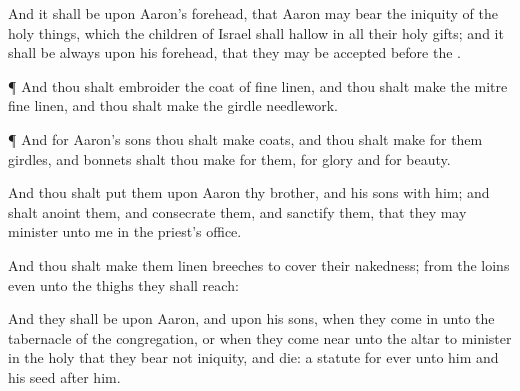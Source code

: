 {And it shall be upon
Aaron’s
forehead, that
Aaron may
bear the
iniquity of the holy
things, which the
children of
Israel shall
hallow in all their
holy
gifts; and it shall be
always upon his
forehead, that they may be
accepted
before the
{}.


\par }{\PP {}¶ And thou shalt
embroider the
coat of fine
linen, and thou shalt
make the
mitre
{} fine
linen, and thou shalt
make the
girdle
{}
needlework.


\par }{\PP {}¶ And for
Aaron’s
sons thou shalt
make
coats, and thou shalt
make for them
girdles, and
bonnets shalt thou
make for them, for
glory and for
beauty.

And thou shalt
put them upon
Aaron thy
brother, and his
sons with him; and shalt
anoint them, and
consecrate them, and
sanctify them, that they may minister unto me in the
priest’s office.

And thou shalt
make them
linen
breeches to
cover their
nakedness; from the
loins even unto the
thighs they shall reach:

And they shall be upon
Aaron, and upon his
sons, when they
come in unto the
tabernacle of the
congregation, or when they come
near unto the
altar to
minister in the
holy
{} that they
bear not
iniquity, and
die:
{} a
statute for
ever unto him and his
seed
after him.




\par }
